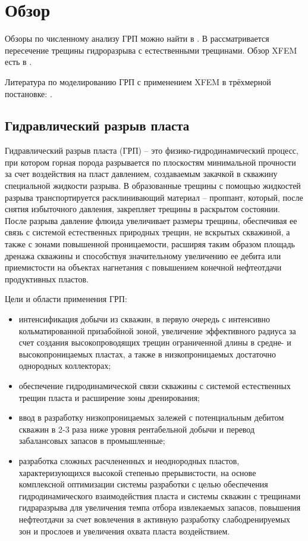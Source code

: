 \chapter{Обзор}
\label{cha:owerview}
Обзоры по численному анализу ГРП можно найти в \cite{GuptaDiss2016, WeberDiss2016, Lecampion2018}. В \cite{Kolawole2020} рассматривается пересечение трещины гидроразрыва с естественными трещинами. Обзор XFEM есть в \cite{PereiraDiss2010,Belytschko2009,Fries2010,Karihaloo2011,Fries2014,flemisch2016,Ahmadkanth2019}.

Литература по моделированию ГРП с применением XFEM в трёхмерной постановке: 
\cite{Gupta2014,Zielonka2014,Gupta2015,GuptaDiss2016,Liu2016,Weber2016,Haddad2016,Gupta2017,Liu2017,Luo2018,Paul2018,Duarte2019,Duarte2020_validation,Duarte2020,Roth2020_1,Roth2020_2,Shi2021}.
\section{Гидравлический разрыв пласта}
Гидравлический разрыв пласта (ГРП) \cite{Magadova2012} -- это физико-гидродинамический процесс, при котором горная порода разрывается по плоскостям минимальной прочности за счет воздействия на пласт давлением, создаваемым закачкой в скважину специальной жидкости разрыва. В образованные трещины с помощью жидкостей разрыва транспортируется расклинивающий материал -- проппант, который, после снятия избыточного давления, закрепляет трещины в раскрытом состоянии. После разрыва давление флюида увеличивает размеры трещины, обеспечивая ее связь с системой естественных природных трещин, не вскрытых скважиной, а также с зонами повышенной проницаемости, расширяя таким образом площадь дренажа скважины и способствуя значительному увеличению ее дебита или приемистости на объектах нагнетания с повышением конечной нефтеотдачи продуктивных пластов.

Цели и области применения ГРП:
\renewcommand{\labelitemi}{$\bullet$}
\begin{itemize}
\item
интенсификация добычи из скважин, в первую очередь с интенсивно кольматированной призабойной зоной, увеличение эффективного радиуса за счет создания высокопроводящих трещин ограниченной длины в средне- и высокопроницаемых пластах, а также в низкопроницаемых достаточно однородных коллекторах;
\item
обеспечение гидродинамической связи скважины с системой естественных трещин пласта и расширение зоны дренирования;
\item
ввод в разработку низкопроницаемых залежей с потенциальным дебитом скважин в 2-3 раза ниже уровня рентабельной добычи и перевод забалансовых запасов в промышленные;
\item
разработка сложных расчлененных и неоднородных пластов, характеризующихся высокой степенью прерывистости, на основе комплексной оптимизации системы разработки с целью обеспечения гидродинамического взаимодействия пласта и системы скважин с трещинами гидраразрыва для увеличения темпа отбора извлекаемых запасов, повышения нефтеотдачи за счет вовлечения в активную разработку слабодренируемых зон и прослоев и увеличения охвата пласта воздействием.
\end{itemize}

